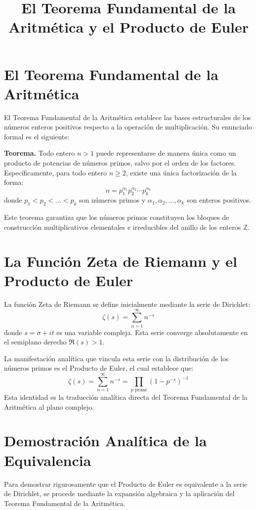 \documentclass{article}
\title{El Teorema Fundamental de la Aritmética y el Producto de Euler}
\author{}
\date{}
\begin{document}
\maketitle

\section{El Teorema Fundamental de la Aritmética}

El Teorema Fundamental de la Aritmética establece las bases estructurales de los números enteros positivos respecto a la operación de multiplicación. Su enunciado formal es el siguiente:

\textbf{Teorema.} Todo entero $n > 1$ puede representarse de manera única como un producto de potencias de números primos, salvo por el orden de los factores. Específicamente, para todo entero $n \geq 2$, existe una única factorización de la forma:
$$ n = p_1^{\alpha_1} p_2^{\alpha_2} \cdots p_k^{\alpha_k} $$
donde $p_1 < p_2 < \dots < p_k$ son números primos y $\alpha_1, \alpha_2, \dots, \alpha_k$ son enteros positivos.

Este teorema garantiza que los números primos constituyen los bloques de construcción multiplicativos elementales e irreducibles del anillo de los enteros $\mathbb{Z}$.

\section{La Función Zeta de Riemann y el Producto de Euler}

La función Zeta de Riemann se define inicialmente mediante la serie de Dirichlet:
$$ \zeta(s) = \sum_{n=1}^{\infty} n^{-s} $$
donde $s = \sigma + it$ es una variable compleja. Esta serie converge absolutamente en el semiplano derecho $\Re(s) > 1$.

La manifestación analítica que vincula esta serie con la distribución de los números primos es el Producto de Euler, el cual establece que:
$$ \zeta(s) = \sum_{n=1}^{\infty} n^{-s} = \prod_{p \text{ prime}} \left(1 - p^{-s}\right)^{-1} $$
Esta identidad es la traducción analítica directa del Teorema Fundamental de la Aritmética al plano complejo.

\section{Demostración Analítica de la Equivalencia}

Para demostrar rigurosamente que el Producto de Euler es equivalente a la serie de Dirichlet, se procede mediante la expansión algebraica y la aplicación del Teorema Fundamental de la Aritmética.
\end{document}
